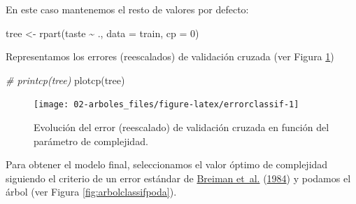 \documentclass[
  spanish,
]{book}
\newenvironment{Shaded}{\begin{snugshade}}{\end{snugshade}}
\newcommand{\AttributeTok}[1]{\textcolor[rgb]{0.77,0.63,0.00}{#1}}
\newcommand{\CommentTok}[1]{\textcolor[rgb]{0.56,0.35,0.01}{\textit{#1}}}
\newcommand{\DecValTok}[1]{\textcolor[rgb]{0.00,0.00,0.81}{#1}}
\newcommand{\FunctionTok}[1]{\textcolor[rgb]{0.00,0.00,0.00}{#1}}
\newcommand{\NormalTok}[1]{#1}
\newcommand{\OtherTok}[1]{\textcolor[rgb]{0.56,0.35,0.01}{#1}}
\newcommand{\SpecialCharTok}[1]{\textcolor[rgb]{0.00,0.00,0.00}{#1}}
\theoremstyle{break}
\theoremstyle{definition}
\theoremstyle{definition}
\theoremstyle{definition}
\theoremstyle{definition}
\theoremstyle{remark}
\begin{document}
En este caso mantenemos el resto de valores por defecto:

\begin{Shaded}
\begin{Highlighting}[]
\NormalTok{tree }\OtherTok{\textless{}{-}} \FunctionTok{rpart}\NormalTok{(taste }\SpecialCharTok{\textasciitilde{}}\NormalTok{ ., }\AttributeTok{data =}\NormalTok{ train, }\AttributeTok{cp =} \DecValTok{0}\NormalTok{)}
\end{Highlighting}
\end{Shaded}

Representamos los errores (reescalados) de validación cruzada (ver Figura \ref{fig:errorclassif})

\begin{Shaded}
\begin{Highlighting}[]
\CommentTok{\# printcp(tree)}
\FunctionTok{plotcp}\NormalTok{(tree)}
\end{Highlighting}
\end{Shaded}

\begin{figure}[!htb]

{\centering \texttt{[image: 02-arboles\_files/figure-latex/errorclassif-1]} 

}

\caption{Evolución del error (reescalado) de validación cruzada en función del parámetro de complejidad.}\label{fig:errorclassif}
\end{figure}

Para obtener el modelo final, seleccionamos el valor óptimo de complejidad siguiendo el criterio de un error estándar de \protect\hyperlink{ref-breiman1984classification}{Breiman et~al.} (\protect\hyperlink{ref-breiman1984classification}{1984}) y podamos el árbol (ver Figura \ref{fig:arbolclassifpoda}).
\end{document}
